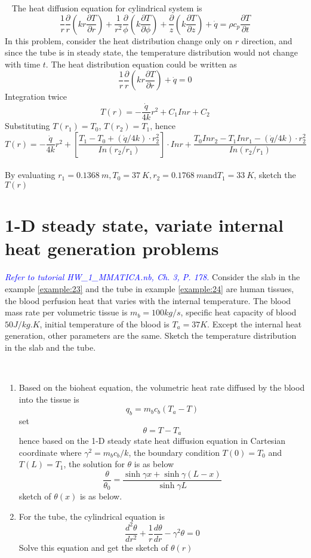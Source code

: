 \begin{solution}
~
The heat diffusion equation for cylindrical system is 
$$ 
\frac{1}{r}\frac{\partial}{r}(kr\frac{\partial T}{\partial r})+
\frac{1}{r^2}\frac{\partial}{\phi}(k\frac{\partial T}{\partial \phi})+
\frac{\partial}{z}(k\frac{\partial T}{\partial z})+
\dot{q} =
\rho c_p\frac{\partial T}{\partial t}
$$
In this problem, consider the heat distribution change only on $r$ direction,
and since the tube is in steady state, the temperature distribution would not
change with time $t$. The heat distribution equation could be written as
$$\frac{1}{r}\frac{\partial}{r}(kr\frac{\partial T}{\partial r})+\dot{q}=0$$
Integration twice
$$T(r)=-\frac{\dot{q}}{4k}r^2+C_1Inr+C_2$$
Substituting $T(r_1)=T_0$, $T(r_2)=T_1$, hence
$$
T(r)=-\frac{\dot{q}}{4k}r^2 +\left[\frac{T_1-T_0+(\dot{q}/4k)\cdot r_2^2}{In(r_2/r_1)} \right]\cdot Inr +
\frac{T_0Inr_2-T_1Inr_1-(\dot{q}/4k)\cdot r_2^2}{In(r_2/r_1)}
$$
~\\
By evaluating $r_1=0.1368~m, T_0=37~K, r_2=0.1768~m \text{and} T_1=33~K$,
sketch the $T(r)$
\end{solution}

\section{1-D steady state, variate internal	heat generation	problems}
\begin{example}
\textcolor{blue} {\emph{Refer to tutorial HW\_1\_MMATICA.nb, Ch. 3, P. 178.}}
Consider the slab in the example \ref{example:23} and the tube in example
\ref{example:24} are human tissues, the blood perfusion heat that varies with the internal temperature. The blood mass rate per volumetric tissue is $m_b=100kg/s$, specific heat capacity of blood $50J/kg.K$, initial temperature of the blood is 
$T_a=37K$. Except the internal heat generation, other parameters are the same. 
Sketch the temperature distribution in the slab and the tube.
\end{example}

\begin{solution}
~
\begin{enumerate}
\item
Based on the bioheat equation, the volumetric heat rate diffused by the blood into the tissue is 
$$q_b=m_b c_b(T_a-T)$$
set$$\theta = T-T_a$$
hence based on the 1-D steady state heat diffusion equation in Cartesian coordinate
where $\gamma^2=m_b c_b/k$, the boundary condition $T(0)=T_0$ and  $T(L)=T_1$,
the solution for $\theta$ is as below
$$\frac{\theta}{\theta_0}=\frac{\sinh\gamma x+\sinh\gamma(L-x)}{\sinh\gamma L}$$
sketch of $\theta(x)$ is as below.
\item
For the tube, the cylindrical equation is
$$\frac{d^2 \theta}{dr^2} + \frac{1}{r}\frac{d\theta}{dr}-\gamma^2\theta=0$$
Solve this equation and get the sketch of $\theta(r)$
\end{enumerate}
\end{solution}

